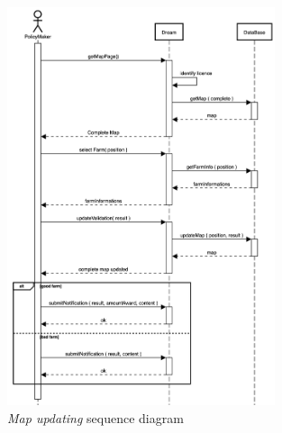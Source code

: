 \begin{enumerate}
    \begin{figure}[H]
        \begin{center}
        \includegraphics[width=0.7\textwidth]{sequence/updateMap.png}
        \caption{\emph{Map updating} sequence diagram}
        \label{fig:sequence13}
        \end{center}
    \end{figure}


\end{enumerate}
